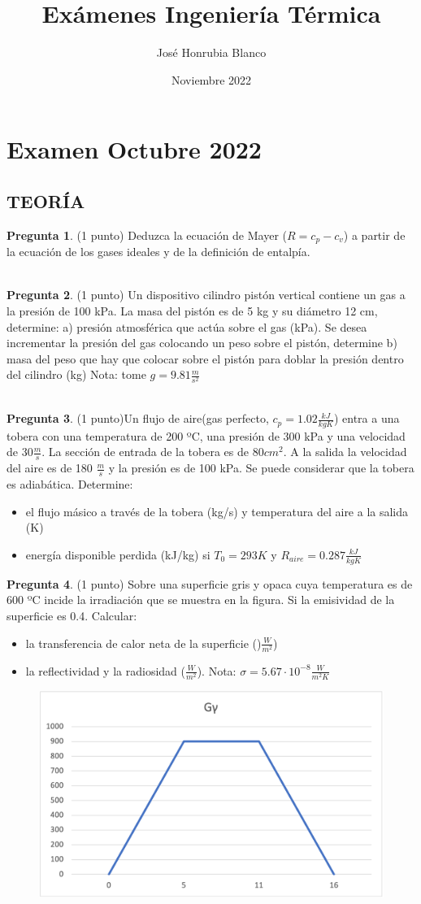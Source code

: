 \documentclass[8pt]{article}
\title{Exámenes Ingeniería Térmica}
\author{José Honrubia Blanco }
\date{Noviembre 2022}
\begin{document}
\section{Examen Octubre 2022}
\subsection{TEORÍA}
\textbf{Pregunta 1}. (1 punto) Deduzca la ecuación de Mayer ($R = c _{p} - c _{v}$) a partir de la ecuación de los gases ideales y de la definición de entalpía.

\\ 
\textbf{Pregunta 2}. (1 punto) Un dispositivo cilindro pistón vertical contiene un gas a la presión de 100 kPa. La masa del pistón es de 5 kg y su diámetro 12 cm, determine: a) presión atmosférica que actúa sobre el gas (kPa). Se desea incrementar la presión del gas colocando un peso sobre el pistón, determine b) masa del peso que hay que colocar sobre el pistón para doblar la presión dentro del cilindro (kg)
Nota: tome $g= 9.81 \frac{m}{s ^{2}}$

\\
\textbf{Pregunta 3}. (1 punto)Un flujo de aire(gas perfecto, $c _{p} = 1.02 \frac{kJ}{kg K}$) entra a una tobera con una temperatura de 200 ºC, una presión de 300 kPa y una velocidad de $30 \frac{m}{s}$. La sección de entrada de la tobera es de $80 cm ^{2}$. A la salida la velocidad del aire es de 180 $\frac{m}{s}$ y la presión es de 100 kPa. Se puede considerar que la tobera es adiabática. Determine:
\begin{itemize}
    \item el flujo másico a través de la tobera (kg/s) y temperatura del aire a la salida (K)
    \item energía disponible perdida (kJ/kg) si $T _{0}= 293 K$ y $R _{aire} = 0.287 \frac{kJ}{kg K}$
\end{itemize}

\textbf{Pregunta 4}. (1 punto) Sobre una superficie gris y  opaca cuya temperatura es de 600 ºC incide la irradiación que se muestra en la figura. Si la emisividad de la superficie es 0.4. Calcular:
\begin{itemize}
    \item la transferencia de calor neta de la superficie ()$\frac{W}{m ^{2}}$)
    \item la reflectividad y la radiosidad ($\frac{W}{m ^{2}}$). Nota: $\sigma = 5.67 \cdot 10 ^{-8} \frac{W}{m ^{2}K}$ 
\end{itemize}
\begin{figure}[h!]
  \centering
  \includegraphics[width=0.3\linewidth]{imagen_1.png}
  \label{fig:}
\end{figure}
\end{document}
